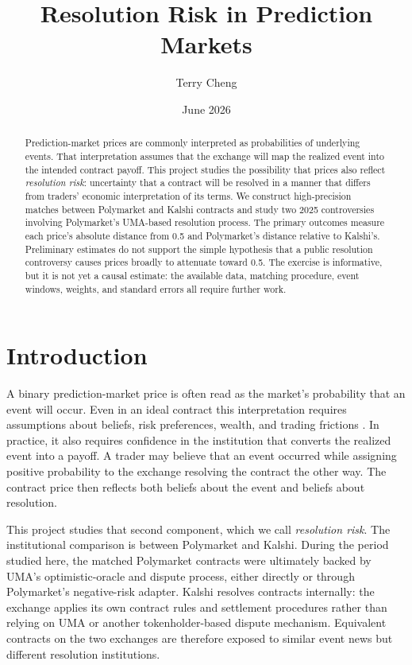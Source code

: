 \documentclass[11pt]{article}
\title{Resolution Risk in Prediction Markets}
\author{Terry Cheng}
\date{June 2026}
\begin{document}
\maketitle

\begin{abstract}
Prediction-market prices are commonly interpreted as probabilities of underlying events.
That interpretation assumes that the exchange will map the realized event into the intended
contract payoff. This project studies the possibility that prices also reflect
\emph{resolution risk}: uncertainty that a contract will be resolved in a manner that differs
from traders' economic interpretation of its terms. We construct high-precision matches
between Polymarket and Kalshi contracts and study two 2025 controversies involving
Polymarket's UMA-based resolution process. The primary outcomes measure each price's
absolute distance from 0.5 and Polymarket's distance relative to Kalshi's. Preliminary
estimates do not support the simple hypothesis that a public resolution controversy causes
prices broadly to attenuate toward 0.5. The exercise is informative, but it is not yet a
causal estimate: the available data, matching procedure, event windows, weights, and standard
errors all require further work.
\end{abstract}

\section{Introduction}

A binary prediction-market price is often read as the market's probability that an event
will occur. Even in an ideal contract this interpretation requires assumptions about beliefs,
risk preferences, wealth, and trading frictions \citep{manski2006,wolfers2006}. In practice,
it also requires confidence in the institution that converts the realized event into a
payoff. A trader may believe that an event occurred while assigning positive probability to
the exchange resolving the contract the other way. The contract price then reflects both
beliefs about the event and beliefs about resolution.

This project studies that second component, which we call \emph{resolution risk}. The
institutional comparison is between Polymarket and Kalshi. During the period studied here,
the matched Polymarket contracts were ultimately backed by UMA's optimistic-oracle and
dispute process, either directly or through Polymarket's negative-risk adapter. Kalshi
resolves contracts internally: the exchange applies its own contract rules and settlement
procedures rather than relying on UMA or another tokenholder-based dispute mechanism.
Equivalent contracts on the two exchanges are therefore exposed to similar event news but
different resolution institutions.
\end{document}
